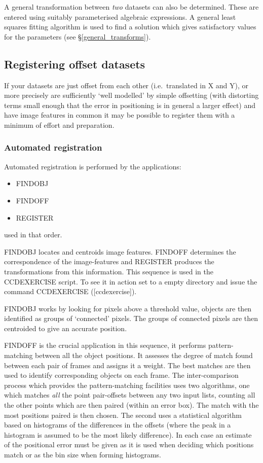 A general transformation between {\em two} datasets can also be
determined. These are entered using suitably parameterised algebraic
expressions. A general least squares fitting algorithm is used to find
a solution which gives satisfactory values for the parameters (see
\S\ref{general_transforms}).

\subsection{Registering offset datasets}

If your datasets are just offset from each other (i.e.\ translated in X
and Y), or more precisely are sufficiently `well modelled' by simple
offsetting (with distorting terms small enough that the error in
positioning is in general a larger effect) and have image features in
common it may be possible to register them with a minimum of effort and
preparation.

\subsubsection{Automated registration}
Automated registration is performed by the applications:
\begin{itemize}
\item FINDOBJ
\item FINDOFF
\item REGISTER
\end{itemize}
used in that order.

FINDOBJ locates and centroids image features. FINDOFF determines the
correspondence of the image-features and REGISTER produces the
transformations from this information. This sequence is used in the
CCDEXERCISE script. To see it in action set to a empty directory and
issue the command CCDEXERCISE ([ccdexercise]).

FINDOBJ works by looking for pixels above a threshold value, objects are
then identified as groups of `connected' pixels. The groups of connected
pixels are then centroided to give an accurate position.

FINDOFF is the crucial application in this sequence, it performs
pattern-matching between all the object positions. It assesses the
degree of match found between each pair of frames and assigns it a
weight. The best matches are then used to identify corresponding objects
on each frame.  The inter-comparison process which provides the
pattern-matching facilities uses two algorithms, one which matches  
{\em all} the point pair-offsets between any two input lists, counting
all the other points which are then paired (within an error box).  The
match with the most positions paired is then chosen. The second  uses a
statistical algorithm based on histograms of the differences in the
offsets (where the peak in a histogram is assumed to be the most likely
difference). In each case an estimate of the positional error must be
given as it is used when deciding which positions match or as the bin 
size when forming histograms.

